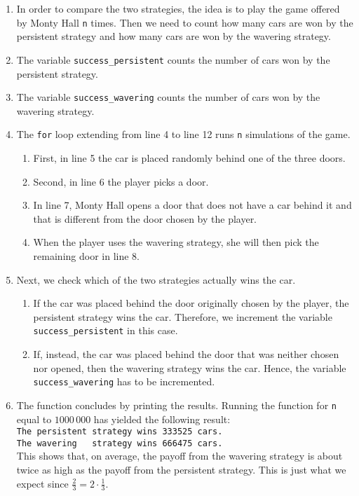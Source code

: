 \begin{enumerate}
\item In order to compare the two strategies, the idea is to play the game offered by Monty Hall
      \texttt{n} times.  Then we need to count how many cars are won by the persistent strategy and how
      many cars are won by the wavering strategy.
\item The variable \texttt{success\_persistent} counts the number of cars won by the persistent strategy.
\item The variable \texttt{success\_wavering}  counts the number of cars won by the wavering  strategy.
\item The \texttt{for} loop extending from line 4 to line 12 runs \texttt{n} simulations of the
       game.
       \begin{enumerate}
       \item First, in line 5 the car is placed randomly behind one of the three doors.
       \item Second, in line 6 the player picks a door.
       \item In line 7, Monty Hall opens a door that does not have a car behind it and that
             is different from the door chosen by the player.
       \item When the player uses the wavering strategy, she will then pick the remaining door in line 8.
       \end{enumerate}
\item Next, we check which of the two strategies actually wins the car.
      \begin{enumerate}
      \item If the car was placed behind the door originally chosen by the player, the persistent
            strategy wins the car.  Therefore, we increment the variable \texttt{success\_persistent} in
            this case.
      \item If, instead, the car was placed behind the door that was neither chosen nor opened, then
            the wavering strategy wins the car.  Hence, the variable \texttt{success\_wavering} has to be incremented.
      \end{enumerate}
\item The function concludes by printing the results.  Running the function for \texttt{n} equal to
      $1000\,000$ has yielded the following result:
      \\[0.2cm]
      \hspace*{1.3cm}
      \texttt{The persistent strategy wins 333525 cars.} \\ 
      \hspace*{1.3cm}
      \texttt{The wavering \ \ strategy wins 666475 cars.}
      \\[0.2cm]
      This shows that, on average, the payoff from the wavering strategy is about twice as high as the
      payoff from the persistent strategy.  This is just what we expect since $\frac{2}{3} = 2 \cdot \frac{1}{3}$.
\end{enumerate}


